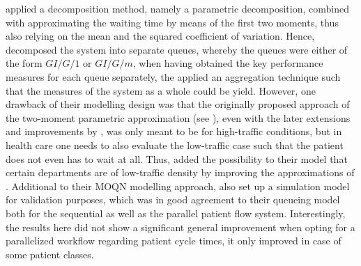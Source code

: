 \documentclass[11pt,a4paper]{article}
\begin{document}
\begin{spacing}{1.8}
 \citet{Jiang2007}  applied a decomposition method, namely a parametric decomposition, combined with approximating the waiting time by means of the first two moments, thus also relying on the mean and the squared coefficient of variation. Hence, \citep{Jiang2007} decomposed the system into separate queues, whereby the queues were either of the form \(GI/G/1\) or \(GI/G/m\), when having obtained the key performance measures for each queue separately, the applied an aggregation technique such that the measures of the system as a whole could be yield.
However, one drawback of their modelling design was that the originally proposed approach of the two-moment parametric approximation (see \citep{Reiser1975}), even with the later extensions and improvements by \citep{Whitt1983},  \citep{Bitran2009} was only meant to be for high-traffic conditions, but in health care one needs to also evaluate the low-traffic case such that the patient does not even has to wait at all. Thus,
\citet{Jiang2007} added the possibility to their model that certain departments are of low-traffic density by improving the approximations of \citep{WHITT2009}.
Additional to their MOQN modelling approach, \citet{Jiang2007} also set up a simulation model for validation purposes, which was in good agreement to their queueing model both for the sequential as well as the parallel patient flow system.
Interestingly, the results here did not show a significant general improvement when opting for a parallelized workflow regarding  patient cycle times, it only improved in case of some patient classes. 



\end{spacing}
\end{document}
